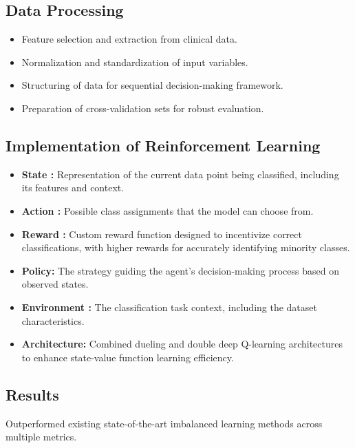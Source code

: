 \subsection*{Data Processing}
\begin{itemize}
    \item Feature selection and extraction from clinical data.
    \item Normalization and standardization of input variables.
    \item Structuring of data for sequential decision-making framework.
    \item Preparation of cross-validation sets for robust evaluation.
\end{itemize}

\subsection*{Implementation of Reinforcement Learning}
\begin{itemize}
    \item \textbf{State :} Representation of the current data point being classified, including its features and context.
    \item \textbf{Action :} Possible class assignments that the model can choose from.
    \item \textbf{Reward :} Custom reward function designed to incentivize correct classifications, with higher rewards for accurately identifying minority classes.
    \item \textbf{Policy:} The strategy guiding the agent's decision-making process based on observed states.
    \item \textbf{Environment :} The classification task context, including the dataset characteristics.
    \item \textbf{Architecture:} Combined dueling and double deep Q-learning architectures to enhance state-value function learning efficiency.
\end{itemize}

\subsection*{Results}
 Outperformed existing state-of-the-art imbalanced learning methods across multiple metrics.
    

